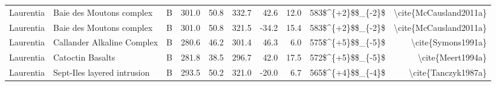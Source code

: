 \begin{longtable}{p{1 in}p{1 in}rrrrrrrr}
                     Laurentia &                         Baie des Moutons complex &      B &     301.0 &      50.8 & 332.7 &  42.6 &      12.0 &      583\$\textasciicircum \{+2\}\$\$\_\{-2\}\$ &                             \textbackslash cite\{McCausland2011a\} \\
                     Laurentia &                         Baie des Moutons complex &      B &     301.0 &      50.8 & 321.5 & -34.2 &      15.4 &      583\$\textasciicircum \{+2\}\$\$\_\{-2\}\$ &                             \textbackslash cite\{McCausland2011a\} \\
                     Laurentia &                       Callander Alkaline Complex &      B &     280.6 &      46.2 & 301.4 &  46.3 &       6.0 &      575\$\textasciicircum \{+5\}\$\$\_\{-5\}\$ &                                 \textbackslash cite\{Symons1991a\} \\
                     Laurentia &                                 Catoctin Basalts &      B &     281.8 &      38.5 & 296.7 &  42.0 &      17.5 &      572\$\textasciicircum \{+5\}\$\$\_\{-5\}\$ &                                  \textbackslash cite\{Meert1994a\} \\
                     Laurentia &                      Sept-Iles layered intrusion &      B &     293.5 &      50.2 & 321.0 & -20.0 &       6.7 &      565\$\textasciicircum \{+4\}\$\$\_\{-4\}\$ &                                \textbackslash cite\{Tanczyk1987a\} \\
\end{longtable}
